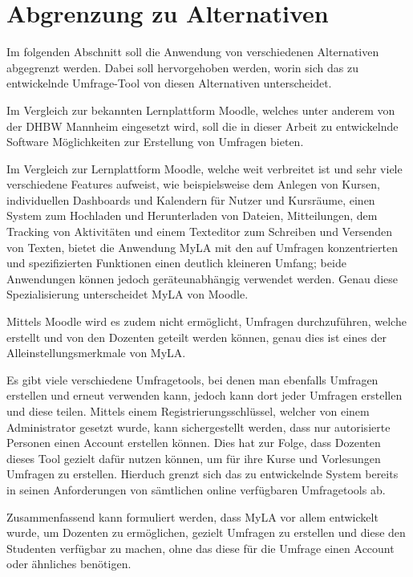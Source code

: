 \section{Abgrenzung zu Alternativen}
\label{sec:AbgrenzungZuAlternativen}

Im folgenden Abschnitt soll die Anwendung von verschiedenen Alternativen abgegrenzt werden.
Dabei soll hervorgehoben werden, worin sich das zu entwickelnde Umfrage-Tool von diesen Alternativen unterscheidet.

Im Vergleich zur bekannten Lernplattform Moodle, welches unter anderem von der \ac{DHBW} Mannheim eingesetzt wird, soll die in dieser Arbeit zu entwickelnde Software Möglichkeiten zur Erstellung von Umfragen bieten.

Im Vergleich zur Lernplattform Moodle, welche weit verbreitet ist und sehr viele verschiedene Features aufweist, wie beispielsweise dem Anlegen von Kursen, individuellen Dashboards und Kalendern für Nutzer und Kursräume, einen System zum Hochladen und Herunterladen von Dateien, Mitteilungen, dem Tracking von Aktivitäten und einem Texteditor zum Schreiben und Versenden von Texten, bietet die Anwendung MyLA mit den auf Umfragen konzentrierten und spezifizierten Funktionen einen deutlich kleineren Umfang;
 beide Anwendungen können jedoch geräteunabhängig verwendet werden\autocite[Vgl.][]{jr-moodle-features}.
Genau diese Spezialisierung unterscheidet MyLA von Moodle.

Mittels Moodle wird es zudem nicht ermöglicht, Umfragen durchzuführen, welche erstellt und von den Dozenten geteilt werden können, genau dies ist eines der Alleinstellungsmerkmale von MyLA.

Es gibt viele verschiedene Umfragetools, bei denen man ebenfalls Umfragen erstellen und erneut verwenden kann, jedoch kann dort jeder Umfragen erstellen und diese teilen.
Mittels einem Registrierungsschlüssel, welcher von einem Administrator gesetzt wurde, kann sichergestellt werden, dass nur autorisierte Personen einen Account erstellen können.
Dies hat zur Folge, dass Dozenten dieses Tool gezielt dafür nutzen können, um für ihre Kurse und Vorlesungen Umfragen zu erstellen.
Hierduch grenzt sich das zu entwickelnde System bereits in seinen Anforderungen von sämtlichen online verfügbaren Umfragetools ab. 

Zusammenfassend kann formuliert werden, dass MyLA vor allem entwickelt wurde, um Dozenten zu ermöglichen, gezielt Umfragen zu erstellen und diese den Studenten verfügbar zu machen, ohne das diese für die Umfrage einen Account oder ähnliches benötigen.
